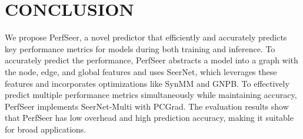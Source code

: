 \section{CONCLUSION}
We propose PerfSeer, a novel predictor that efficiently and accurately predicts key performance metrics for models during both training and inference. 
To accurately predict the performance, PerfSeer abstracts a model into a graph with the node, edge, and global features and uses SeerNet, which leverages these features and incorporates optimizations like SynMM and GNPB.
To effectively predict multiple performance metrics simultaneously while maintaining accuracy, PerfSeer implements SeerNet-Multi with PCGrad. 
The evaluation results show that PerfSeer has low overhead and high prediction accuracy, making it suitable for broad applications.